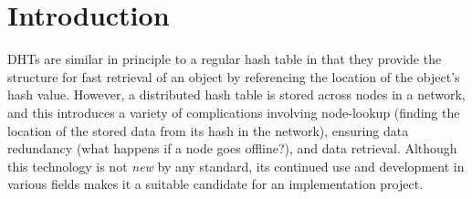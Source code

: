 \documentclass[12pt]{report}
\begin{document}
	
	
	\pagebreak %
	
	\tableofcontents
	
	\pagebreak

    \section{Introduction\label{introduction}}
    DHTs are similar in principle to a regular hash table in that they provide
    the structure for fast retrieval of an object by referencing the location
    of the object's hash value.  However, a distributed hash table is stored
    across nodes in a network, and this introduces a variety of complications
    involving node-lookup (finding the location of the stored data from its
    hash in the network), ensuring data redundancy (what happens if a node goes
    offline?), and data retrieval.  Although this technology is not
    \textit{new} by any standard, its continued use and development in various
    fields makes it a suitable candidate for an implementation project.
\end{document}
